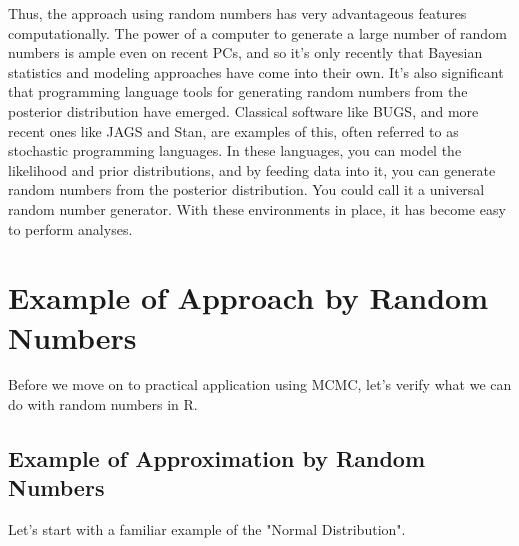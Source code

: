 \documentclass{ltjsbook}
\begin{document}
Thus, the approach using random numbers has very advantageous features computationally. The power of a computer to generate a large number of random numbers is ample even on recent PCs, and so it's only recently that Bayesian statistics and modeling approaches have come into their own. It's also significant that programming language tools for generating random numbers from the posterior distribution have emerged. Classical software like BUGS, and more recent ones like JAGS and Stan, are examples of this, often referred to as stochastic programming languages. In these languages, you can model the likelihood and prior distributions, and by feeding data into it, you can generate random numbers from the posterior distribution. You could call it a universal random number generator. With these environments in place, it has become easy to perform analyses.

\section{Example of Approach by Random Numbers}
Before we move on to practical application using MCMC, let's verify what we can do with random numbers in R.

\subsection{Example of Approximation by Random Numbers}
Let's start with a familiar example of the "Normal Distribution".
\end{document}
